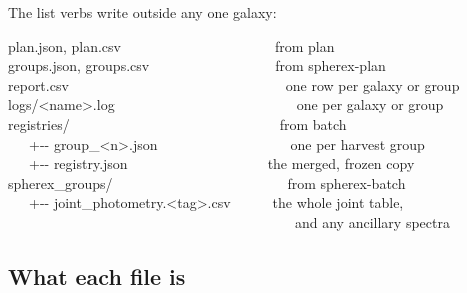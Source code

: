 \documentclass[11pt]{article}
\begin{document}
The list verbs write outside any one galaxy:

\begin{cmd}\ttfamily\frenchspacing
plan.json, plan.csv~~~~~~~~~~~~~~~~~~~~~~from plan\\
groups.json, groups.csv~~~~~~~~~~~~~~~~~~from spherex-plan\\
report.csv~~~~~~~~~~~~~~~~~~~~~~~~~~~~~~~one row per galaxy or group\\
logs/<name>.log~~~~~~~~~~~~~~~~~~~~~~~~~~one per galaxy or group\\
registries/~~~~~~~~~~~~~~~~~~~~~~~~~~~~~~from batch\\
\mbox{}~~~+-{}- group\_<n>.json~~~~~~~~~~~~~~~~~~~one per harvest group\\
\mbox{}~~~+-{}- registry.json~~~~~~~~~~~~~~~~~~~~the merged, frozen copy\\
spherex\_groups/~~~~~~~~~~~~~~~~~~~~~~~~~from spherex-batch\\
\mbox{}~~~+-{}- joint\_photometry.<tag>.csv~~~~~~the whole joint table,\\
\mbox{}~~~~~~~~~~~~~~~~~~~~~~~~~~~~~~~~~~~~~~~~~and any ancillary spectra
\end{cmd}

\subsection{What each file is}
\end{document}
